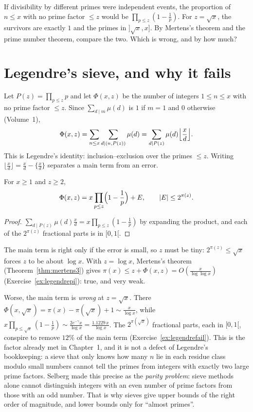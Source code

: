 \begin{think}
If divisibility by different primes were independent events, the proportion of $n\le x$ with no prime factor $\le z$ would be $\prod_{p\le z}(1-\frac1p)$. For $z=\sqrt x$, the survivors
are exactly $1$ and the primes in $]\sqrt x,x]$. By Mertens's theorem and the prime number theorem, compare the two. Which is wrong, and by how much?
\end{think}

\section{Legendre's sieve, and why it fails}

Let $P(z)=\prod_{p\le z}p$ and let $\Phi(x,z)$ be the number of integers $1\le n\le x$ with no prime factor $\le z$. Since $\sum_{d\mid m}\mu(d)$ is $1$ if $m=1$ and $0$ otherwise (Volume~1),
\[
\Phi(x,z)=\sum_{n\le x}\sum_{d\mid(n,P(z))}\mu(d)=\sum_{d\mid P(z)}\mu(d)\Bigl\lfloor\frac xd\Bigr\rfloor.
\]
This is Legendre's identity: inclusion--exclusion over the primes $\le z$. Writing $\lfloor\frac xd\rfloor=\frac xd-\{\frac xd\}$ separates a main term from an error.

\begin{proposition}[Legendre, 1808]\label{prop:legendre}
For $x\ge1$ and $z\ge2$,
\[
\Phi(x,z)=x\prod_{p\le z}\Bigl(1-\frac1p\Bigr)+E,\qquad|E|\le2^{\pi(z)}.
\]
\end{proposition}
\begin{proof}
$\sum_{d\mid P(z)}\mu(d)\frac xd=x\prod_{p\le z}(1-\frac1p)$ by expanding the product, and each of the $2^{\pi(z)}$ fractional parts is in $[0,1[$.
\end{proof}

The main term is right only if the error is small, so $z$ must be tiny: $2^{\pi(z)}\le\sqrt x$ forces $z$ to be about $\log x$. With $z=\log x$, Mertens's theorem
(Theorem~\ref{thm:mertens3}) gives $\pi(x)\le z+\Phi(x,z)=O(\frac x{\log\log x})$ (Exercise~\ref{ex:legendrepi}): true, and very weak.

Worse, the main term is \emph{wrong} at $z=\sqrt x$. There $\Phi(x,\sqrt x)=\pi(x)-\pi(\sqrt x)+1\sim\frac x{\log x}$, while $x\prod_{p\le\sqrt x}(1-\frac1p)\sim\frac{2e^{-\gamma}x}{\log x}=\frac{1.1229\,x}{\log x}$. The
$2^{\pi(\sqrt x)}$ fractional parts, each in $[0,1[$, conspire to remove $12\%$ of the main term (Exercise~\ref{ex:legendrefail}). This is the factor already met in Chapter~1, and it is not a
defect of Legendre's bookkeeping: a sieve that only knows how many $n$ lie in each residue class modulo small numbers cannot tell the primes from integers with exactly two large prime
factors. Selberg made this precise as the \emph{parity problem}: sieve methods alone cannot distinguish integers with an even number of prime factors from those with an odd number.
That is why sieves give upper bounds of the right order of magnitude, and lower bounds only for ``almost primes''.

